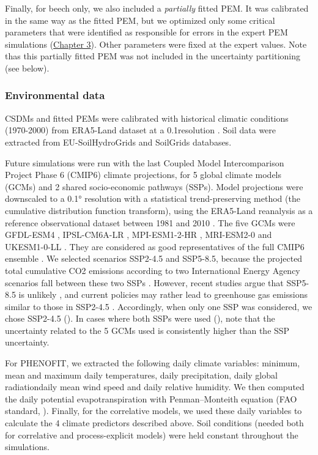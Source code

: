 Finally, for beech only, we also included a \emph{partially} fitted PEM. It was calibrated in the same way as the fitted PEM, but we optimized only some critical parameters that were identified as responsible for errors in the expert PEM simulations (\hyperref[chapter3]{Chapter 3}). Other parameters were fixed at the expert values. Note thas this partially fitted PEM was not included in the uncertainty partitioning (see below).

\subsubsection{Environmental data}

CSDMs and fitted PEMs were calibrated with historical climatic conditions (1970-2000) from ERA5-Land dataset at a 0.1\degree resolution \citep{MunozSabater2021}. Soil data were extracted from EU-SoilHydroGrids \citep{Toth2017} and SoilGrids \citep{Hengl2017} databases.

Future simulations were run with the last Coupled Model Intercomparison Project Phase 6 (CMIP6) climate  projections, for 5 global climate models (GCMs) and 2 shared socio-economic pathways (SSPs). 
Model projections were downscaled to a 0.1° resolution with a statistical trend-preserving method (the cumulative distribution function transform), using the ERA5-Land reanalysis as a reference observational dataset between 1981 and 2010 \citep{Noel2022}. The five GCMs were GFDL-ESM4 \citep{Dunne2020}, IPSL-CM6A-LR \citep{Lurton2020}, MPI-ESM1-2-HR \citep{Mueller2018}, MRI-ESM2-0 \citep{Yukimoto2019} and UKESM1-0-LL \citep{Sellar2020}. They are considered as good representatives of the full CMIP6 ensemble \citep{Noel2022}. We selected scenarios SSP2-4.5 and SSP5-8.5, because the projected total cumulative CO2 emissions according to two International Energy Agency scenarios fall between these two SSPs \citep{Schwalm2020}. However, recent studies argue that SSP5-8.5 is unlikely \citep{Hausfather2020}, and current policies may rather lead to greenhouse gas emissions similar to those in SSP2-4.5 \citep{Gillett2024}. Accordingly, when only one SSP was considered, we chose SSP2-4.5 (). In cases where both SSPs were used (), note that the uncertainty related to the 5 GCMs used is consistently higher than the SSP uncertainty.

For PHENOFIT, we extracted the following daily climate variables: minimum, mean and maximum daily temperatures, daily precipitation, daily global radiationdaily mean wind speed and daily relative humidity. We then computed the daily potential evapotranspiration with Penman–Monteith equation (FAO standard, \citealp{Allen1998}). Finally, for the correlative models, we used these daily variables to calculate the 4 climate predictors described above.  Soil conditions (needed both for correlative and process-explicit models) were held constant throughout the simulations.


